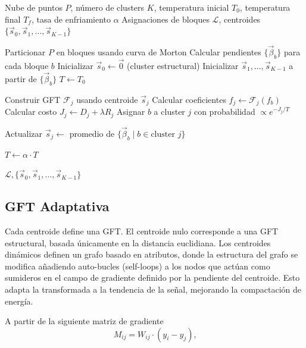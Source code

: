 \begin{algorithm}[t]
\caption{Agrupamiento Tasa-Distorsión con Simulated Annealing}
\label{alg:rd_clustering}
\begin{algorithmic}[1]
\REQUIRE Nube de puntos $P$, número de clusters $K$, temperatura inicial $T_0$, temperatura final $T_f$, tasa de enfriamiento $\alpha$
\ENSURE Asignaciones de bloques $\mathcal{L}$, centroides $\{\vec{s}_0, \vec{s}_1, \ldots, \vec{s}_{K-1}\}$

\STATE Particionar $P$ en bloques usando curva de Morton
\STATE Calcular pendientes $\{\vec{\beta}_b\}$ para cada bloque $b$
\STATE Inicializar $\vec{s}_0 \leftarrow \vec{0}$ (cluster estructural)
\STATE Inicializar $\vec{s}_1, \ldots, \vec{s}_{K-1}$ a partir de $\{\vec{\beta}_b\}$
\STATE $T \leftarrow T_0$

            \STATE Construir GFT $\mathcal{F}_j$ usando centroide $\vec{s}_j$
            \STATE Calcular coeficientes $\hat{f}_j \leftarrow \mathcal{F}_j(f_b)$
            \STATE Calcular costo $J_j \leftarrow D_j + \lambda R_j$
        \ENDFOR
        \STATE Asignar $b$ a cluster $j$ con probabilidad $\propto e^{-J_j/T}$
    \ENDFOR
    
        \STATE Actualizar $\vec{s}_j \leftarrow$ promedio de $\{\vec{\beta}_b \mid b \in \text{cluster } j\}$
    \ENDFOR
    
    \STATE $T \leftarrow \alpha \cdot T$
\ENDWHILE

\RETURN $\mathcal{L}, \{\vec{s}_0, \vec{s}_1, \ldots, \vec{s}_{K-1}\}$
\end{algorithmic}
\end{algorithm}

\subsection{GFT Adaptativa}
Cada centroide define una GFT. El centroide nulo corresponde a una GFT estructural, basada únicamente en la distancia
euclidiana. Los centroides dinámicos definen un grafo basado en atributos, donde la estructura del grafo se modifica añadiendo
auto-bucles (self-loops) a los nodos que actúan como sumideros en el campo de gradiente definido por la pendiente
del centroide. Esto adapta la transformada a la tendencia de la señal, mejorando la compactación de energía\cite{pavez2017separable}.

A partir de la siguiente matriz de gradiente
\begin{equation}
    M_{ij} = W_{ij} \cdot (y_i - y_j) \text{,}
\end{equation}

